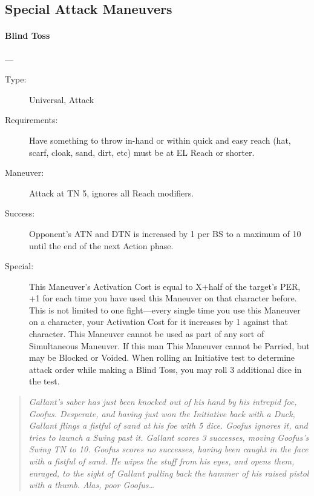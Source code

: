 \documentclass[oneside,11pt,english]{book}
\begin{document}
\subsection{Special Attack Maneuvers}
\paragraph{\large\label{man:Blind Toss}Blind Toss}---\quad{\large[x+Variable]}
\vspace{-10pt}\begin{description} 
\item [Type:] Universal, Attack 
\item [Requirements:] Have something to throw in-hand or within quick and easy reach (hat, scarf, cloak, sand, 
  dirt, etc) must be at EL Reach or shorter. 
\item [Maneuver:] Attack at TN 5, ignores all Reach modifiers. 
\item [Success:] Opponent's ATN and DTN is increased by 1 per BS to a maximum of 10 until the end of the 
  next Action phase. 
\item [Special:] This Maneuver’s Activation Cost is equal to X+half of the target's PER, +1 for each time you 
  have used this Maneuver on that character before. This is not limited to one fight—every single time you 
  use this Maneuver on a character, your Activation Cost for it increases by 1 against that character. 
  This Maneuver cannot be used as part of any sort of Simultaneous Maneuver. 
  If this man %
  This Maneuver cannot be Parried, but may be Blocked or Voided. 
  When rolling an Initiative test to determine attack order while making a Blind Toss, you may roll 3 
  additional dice in the test.
\end{description}
\begin{quotation}
  \emph{Gallant’s saber has just been knocked out of his hand by his intrepid foe, Goofus. Desperate, and having just won the Initiative 
    back with a Duck, Gallant flings a fistful of sand at his foe with 5 dice. Goofus ignores it, and tries to launch a Swing past it. 
    Gallant scores 3 successes, moving Goofus’s Swing TN to 10. Goofus scores no successes, having been caught in the face with a 
    fistful of sand. He wipes the stuff from his eyes, and opens them, enraged, to the sight of Gallant pulling back the hammer of his 
    raised pistol with a thumb. Alas, poor Goofus\ldots}
\end{quotation}
\end{document}

